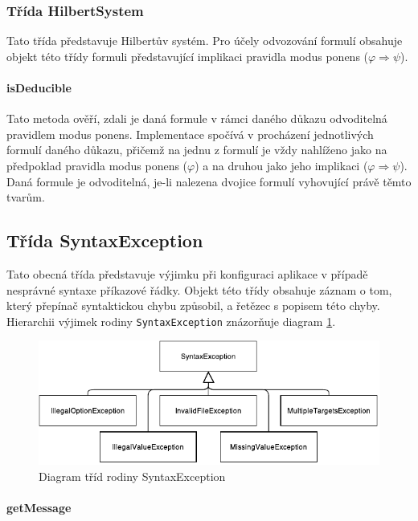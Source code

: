 \documentclass[thesis=B,czech,hidelinks]{thesis}[2012/06/26]
\begin{document}
\subsubsection{Třída HilbertSystem}

Tato třída představuje Hilbertův systém. Pro účely odvozování formulí obsahuje objekt této třídy formuli představující implikaci pravidla modus ponens ($\varphi \Rightarrow \psi$).

\paragraph{isDeducible}

Tato metoda ověří, zdali je daná formule v rámci daného důkazu odvoditelná pravidlem modus ponens. Implementace spočívá v procházení jednotlivých formulí daného důkazu, přičemž na jednu z formulí je vždy nahlíženo jako na předpoklad pravidla modus ponens ($\varphi$) a na druhou jako jeho implikaci ($\varphi \Rightarrow \psi$). Daná formule je odvoditelná, je-li nalezena dvojice formulí vyhovující právě těmto tvarům.

\subsection{Třída SyntaxException}

Tato obecná třída představuje výjimku při konfiguraci aplikace v případě nesprávné syntaxe příkazové řádky. Objekt této třídy obsahuje záznam o tom, který přepínač syntaktickou chybu způsobil, a řetězec s popisem této chyby. Hierarchii výjimek rodiny \texttt{SyntaxException} znázorňuje diagram \ref{fig:syntax_exception}.

\begin{figure}
\centering
\caption{Diagram tříd rodiny SyntaxException}
\label{fig:syntax_exception}
\includegraphics{diagrams/syntax_exception}
\end{figure}

\paragraph{getMessage}
\end{document}
